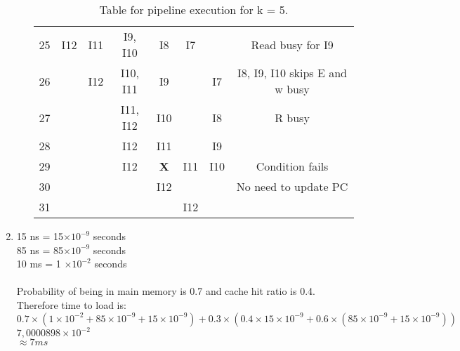 \documentclass[12pt]{article}
\begin{document}
\begin{enumerate}
\begin{enumerate}
\begin{table}[h!]
\begin{tabular}{||c||c|c|c|c|c|c|c||}
             25 & I12 & I11 & I9, I10 & I8 & I7 & & Read busy for I9\\
             26 & & I12 & I10, I11 & I9 & & I7 & I8, I9, I10 skips E and w busy\\
             27 & & & I11, I12 & I10 & & I8 & R busy\\
             28 & & & I12 & I11 & & I9 & \\
             29 & & & I12 & \textbf{X} & I11 & I10 & Condition fails\\
             30 & & & & I12 & & & No need to update PC\\
             31 & & & & & I12 & & \\
             [1ex]
             \hline
            \end{tabular}
            \caption{Table for pipeline execution for k = 5.}
            \label{table:1}
            \end{table}
        \end{enumerate}
        \item 15 ns = 15$\times 10^{-9}$ seconds\\
        85 ns = 85$\times 10^{-9}$ seconds\\
        10 ms = 1 $\times 10^{-2}$ seconds\\
        \\
        Probability of being in main memory is 0.7 and cache hit ratio is 0.4. Therefore time to load is:\\
        $0.7 \times (1 \times 10^{-2} + 85 \times 10^{-9} + 15 \times 10^{-9}) + 0.3 \times (0.4 \times 15 \times 10^{-9} + 0.6 \times (85 \times 10^{-9} + 15 \times 10^{-9}))$\\
        $7,0000898 \times 10^{-2}$\\
        $\approx 7 ms$

    \end{enumerate}
\end{document}
